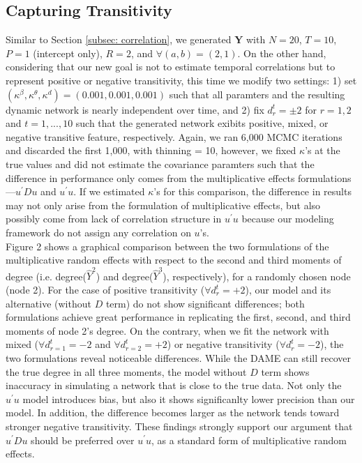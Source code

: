 \documentclass[a4paper]{article}
\begin{document}
\subsection{Capturing Transitivity} \label{subsec: negative transitivity}
Similar to Section \ref{subsec: correlation}, we generated  $\mathbf{Y}$ with $N=20$, $T=10$, $P=1$ (intercept only), $R=2$, and $\forall (a, b) = (2, 1)$. On the other hand, considering that our new goal is not to estimate temporal correlations but to represent positive or negative transitivity, this time we modify two settings: 1) set $(\kappa^\beta, \kappa^\theta, \kappa^d) = (0.001, 0.001, 0.001)$ such that all paramters and the resulting dynamic network is nearly independent over time, and 2) fix $d^t_{r} = \pm 2$ for $r=1,2$ and $t=1,...,10$ such that the generated network exibits positive, mixed, or negative transitive feature, respectively. Again, we ran 6,000 MCMC iterations and discarded the first 1,000, with thinning = 10, however, we fixed $\kappa$'s at the true values and did not estimate the covariance paramters such that the difference in performance only comes from the multiplicative effects formulations---$u^\prime Du$ and $u^\prime u$. If we estimated $\kappa$'s for this comparison, the difference in results may not only arise from the formulation of multiplicative effects, but also possibly come from lack of correlation structure in $u^\prime u$ because our modeling framework do not assign any correlation on $u$'s.   \\ \newline 
Figure 2 shows a graphical comparison between the two formulations of the multiplicative random effects with respect to the second and third moments of degree (i.e. degree($\hat{Y}^2$) and degree($\hat{Y}^3$), respectively), for a randomly chosen node (node 2). For the case of positive transitivity ($\forall d^t_{r} =+2$), our model and its alternative (without $D$ term) do not show significant differences; both formulations achieve great performance in replicating the first, second, and third moments of node 2's degree. On the contrary, when we fit the network with mixed ($\forall d^t_{r=1} =-2$ and $\forall d^t_{r=2} =+2$) or negative transitivity ($\forall d^t_{r} =-2$), the two formulations reveal noticeable differences. While the DAME can still recover the true degree in all three moments, the model without $D$ term shows inaccuracy in simulating a network that is close to the true data. Not only the $u^\prime u$ model introduces bias, but also it shows significanlty lower precision than our model. In addition, the difference becomes larger as the network tends toward stronger negative transitivity. These findings strongly support our argument that $u^\prime Du$ should be preferred over $u^\prime u$, as a standard form of multiplicative random effects.
\end{document}
